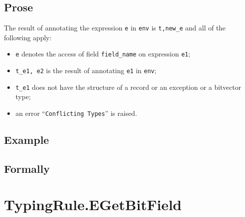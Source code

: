\documentclass{book}
\begin{document}
\begin{itemize}
 \subsection{Prose}
  The result of annotating the expression \texttt{e} in \texttt{env} is
\texttt{t,new\_e} and all of the following apply:
   \begin{itemize}
   \item \texttt{e} denotes the access of field \texttt{field\_name} on expression \texttt{e1};
   \item \texttt{t\_e1, e2} is the result of annotating \texttt{e1} in \texttt{env};
   \item \texttt{t\_e1} does not have the structure of a record or an exception or a bitvector type;
   \item an error ``\texttt{Conflicting Types}'' is raised.
   \end{itemize}

 \subsection{Example}



\begin{emptyformal}
    \subsection{Formally}

\end{emptyformal}


\section{TypingRule.EGetBitField \label{sec:TypingRule.EGetBitField}}


\end{itemize}
\end{document}
